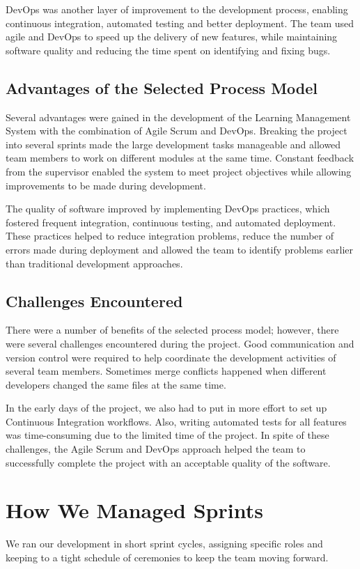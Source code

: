 \documentclass[12pt,a4paper]{article}
\begin{document}
DevOps was another layer of improvement to the development process, enabling continuous integration, automated testing and better deployment. The team used agile and DevOps to speed up the delivery of new features, while maintaining software quality and reducing the time spent on identifying and fixing bugs.

\subsection{Advantages of the Selected Process Model}
Several advantages were gained in the development of the Learning Management System with the combination of Agile Scrum and DevOps. Breaking the project into several sprints made the large development tasks manageable and allowed team members to work on different modules at the same time. Constant feedback from the supervisor enabled the system to meet project objectives while allowing improvements to be made during development.

The quality of software improved by implementing DevOps practices, which fostered frequent integration, continuous testing, and automated deployment. These practices helped to reduce integration problems, reduce the number of errors made during deployment and allowed the team to identify problems earlier than traditional development approaches.

\subsection{Challenges Encountered}
There were a number of benefits of the selected process model; however, there were several challenges encountered during the project. Good communication and version control were required to help coordinate the development activities of several team members. Sometimes merge conflicts happened when different developers changed the same files at the same time.

In the early days of the project, we also had to put in more effort to set up Continuous Integration workflows. Also, writing automated tests for all features was time-consuming due to the limited time of the project. In spite of these challenges, the Agile Scrum and DevOps approach helped the team to successfully complete the project with an acceptable quality of the software.

\section{How We Managed Sprints}
We ran our development in short sprint cycles, assigning specific roles and keeping to a tight schedule of ceremonies to keep the team moving forward.
\end{document}
